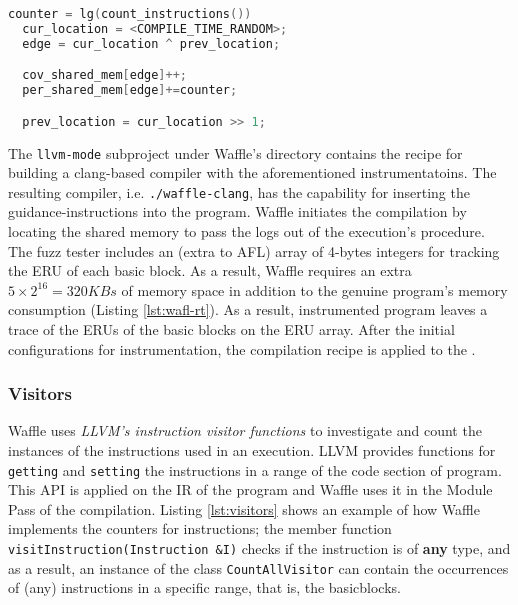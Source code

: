 
\begin{lstlisting}[language=C++,style=CodeStyle,label={lst:hash},caption={Select element and update in shared\_mem}]
  counter = lg(count_instructions())
  cur_location = <COMPILE_TIME_RANDOM>;
  edge = cur_location ^ prev_location;

  cov_shared_mem[edge]++;
  per_shared_mem[edge]+=counter;

  prev_location = cur_location >> 1;
\end{lstlisting}

The \texttt{llvm-mode} subproject under Waffle's directory contains the recipe for building a clang-based compiler with the aforementioned instrumentatoins. The resulting compiler, i.e. \texttt{./waffle-clang}, has the capability for inserting the guidance-instructions into the program. Waffle initiates the compilation by locating the shared memory to pass the logs out of the execution's procedure. The fuzz tester includes an (extra to AFL) array of 4-bytes integers for tracking the ERU of each basic block. As a result, Waffle requires an extra $5\times2^{16}=320KBs$ of memory space in addition to the genuine program's memory consumption (Listing \ref{lst:wafl-rt}). As a result, instrumented program leaves a trace of the ERUs of the basic blocks on the ERU array. After the initial configurations for instrumentation, the compilation recipe is applied to the .
  
  


\subsubsection{Visitors}

Waffle uses \textit{LLVM's instruction visitor functions} \cite{inst_visitor} to investigate and count the instances of the instructions used in an execution. LLVM provides functions for \texttt{getting} and \texttt{setting} the instructions in a range of the code section of program. This API is applied on the IR of the program and Waffle uses it in the Module Pass of the compilation. Listing \ref{lst:visitors} shows an example of how Waffle implements the counters for instructions; the member function \texttt{visitInstruction(Instruction \&I)} checks if the instruction is of \textbf{any} type, and as a result, an instance of the class \texttt{CountAllVisitor} can contain the occurrences of (any) instructions in a specific range, that is, the basicblocks.

